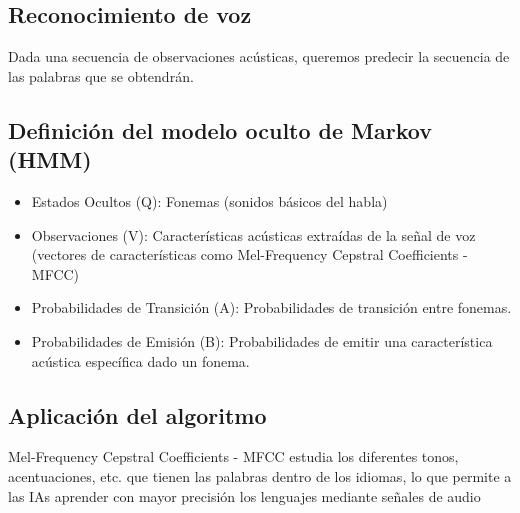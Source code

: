 \documentclass[11pt,openany]{book}
\begin{document}
\subsection{Reconocimiento de voz}

Dada una secuencia de observaciones acústicas, queremos predecir la secuencia de las palabras que se obtendrán.
\subsection*{Definición del modelo oculto de Markov (HMM)}
      \begin{itemize}
            \item  Estados Ocultos (Q): Fonemas (sonidos básicos del habla)
            \item  Observaciones (V): Características acústicas extraídas de la señal de voz (vectores de características como Mel-Frequency Cepstral Coefficients - MFCC)
            \item  Probabilidades de Transición (A): Probabilidades de transición entre fonemas.
            \item  Probabilidades de Emisión (B): Probabilidades de emitir una característica acústica específica dado un fonema.
      \end{itemize}
\subsection*{Aplicación del algoritmo}  
    Mel-Frequency Cepstral Coefficients - MFCC estudia los diferentes tonos, acentuaciones, etc. que tienen las palabras dentro de los idiomas, lo que permite a las IAs aprender
    con mayor precisión los lenguajes mediante señales de audio
\end{document}
